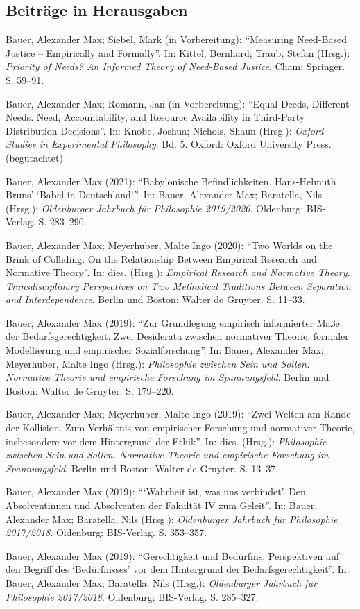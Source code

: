 \documentclass[a4paper,10pt]{article}
\newenvironment{literature}{%
   \parskip6pt\parindent0pt\raggedright
   \def\lititem{\hangindent=1cm\hangafter1}}{%
   \par\ignorespaces}
\begin{document}
\subsection*{Beiträge in Herausgaben}
\begin{literature}
\lititem Bauer, Alexander Max; Siebel, Mark (in Vorbereitung): \enquote{Measuring Need-Based Justice -- Empirically and Formally}. In: Kittel, Bernhard; Traub, Stefan (Hrsg.): \textit{Priority of Needs? An Informed Theory of Need-Based Justice}. Cham: Springer. S. 59–91.

\lititem Bauer, Alexander Max; Romann, Jan (in Vorbereitung): \enquote{Equal Deeds, Different Needs. Need, Accountability, and Resource Availability in Third-Party Distribution Decisions}. In: Knobe, Joshua; Nichols, Shaun (Hrsg.): \textit{Oxford Studies in Experimental Philosophy}. Bd. 5. Oxford: Oxford University Press. (begutachtet)

\lititem Bauer, Alexander Max (2021): \enquote{Babylonische Befindlichkeiten. Hans-Helmuth Bruns' \enquote{Babel in Deutschland}}. In: Bauer, Alexander Max; Baratella, Nils (Hrsg.): \textit{Oldenburger Jahrbuch für Philosophie 2019/2020}. Oldenburg: BIS-Verlag. S. 283--290.

\lititem Bauer, Alexander Max; Meyerhuber, Malte Ingo (2020): \enquote{Two Worlds on the Brink of Colliding. On the Relationship Between Empirical Research and Normative Theory}. In: dies. (Hrsg.): \textit{Empirical Research and Normative Theory. Transdisciplinary Perspectives on Two Methodical Traditions Between Separation and Interdependence}. Berlin und Boston: Walter de Gruyter. S. 11--33.

\lititem Bauer, Alexander Max (2019): \enquote{Zur Grundlegung empirisch informierter Maße der Bedarfsgerechtigkeit. Zwei Desiderata zwischen normativer Theorie, formaler Modellierung und empirischer Sozialforschung}. In: Bauer, Alexander Max; Meyerhuber, Malte Ingo (Hrsg.): \textit{Philosophie zwischen Sein und Sollen. Normative Theorie und empirische Forschung im Spannungsfeld}. Berlin und Boston: Walter de Gruyter. S. 179--220.

\lititem Bauer, Alexander Max; Meyerhuber, Malte Ingo (2019): \enquote{Zwei Welten am Rande der Kollision. Zum Verhältnis von empirischer Forschung und normativer Theorie, insbesondere vor dem Hintergrund der Ethik}. In: dies. (Hrsg.): \textit{Philosophie zwischen Sein und Sollen. Normative Theorie und empirische Forschung im Spannungsfeld}. Berlin und Boston: Walter de Gruyter. S. 13--37.

\lititem Bauer, Alexander Max (2019): \enquote{\enquote{Wahrheit ist, was uns verbindet}. Den Absolventinnen und Absolventen der Fakultät IV zum Geleit}. In: Bauer, Alexander Max; Baratella, Nils (Hrsg.): \textit{Oldenburger Jahrbuch für Philosophie 2017/2018}. Oldenburg: BIS-Verlag. S. 353--357.

\lititem Bauer, Alexander Max (2019): \enquote{Gerechtigkeit und Bedürfnis. Perspektiven auf den Begriff des \enquote{Bedürfnisses} vor dem Hintergrund der Bedarfsgerechtigkeit}. In: Bauer, Alexander Max; Baratella, Nils (Hrsg.): \textit{Oldenburger Jahrbuch für Philosophie 2017/2018}. Oldenburg: BIS-Verlag. S. 285--327.
\end{literature}
\end{document}
